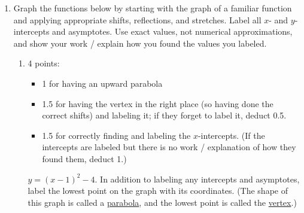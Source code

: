 \documentclass{article}
\begin{document}
\begin{enumerate}
\begin{enumerate}
    \begin{problem}
      $k(x) = 2 f(x)$
    \end{problem}


  \end{enumerate}

  \pspace{\newpage}

\item  

  Graph the functions below by starting with the graph of a familiar function and applying appropriate shifts, reflections, and stretches. Label all $x$- and $y$-intercepts and asymptotes. Use exact values, not numerical approximations, and show your work / explain how you found the values you labeled.

  \begin{enumerate}

  \item \label{graph-shifted-parabola}

    \begin{grading}
      4 points:
      \begin{itemize}[nosep]
      \item 1 for having an upward parabola
      \item 1.5 for having the vertex in the right place (so having done the correct shifts) and labeling it; if they forget to label it, deduct 0.5.
      \item 1.5 for correctly finding and labeling the $x$-intercepts. (If the intercepts are labeled but there is no work / explanation of how they found them, deduct 1.)
      \end{itemize}

    \end{grading}

    \begin{problem}[\vfill]
      $y = (x-1)^2 - 4$. In addition to labeling any intercepts and asymptotes, label the lowest point on the graph with its coordinates. (The shape of this graph is called a \uline{parabola}, and the lowest point is called the \uline{vertex}.)
    \end{problem}


\end{enumerate}
\end{enumerate}
\end{document}
